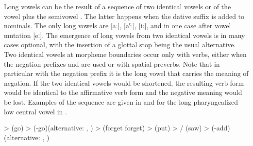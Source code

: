Long vowels can be the result of a sequence of two identical vowels or of the vowel  plus the semivowel . The latter happens when the dative suffix is added to nominals. The only long vowels are [aː], [aˁː], [iː], and in one case after vowel mutation [eː]. The emergence of long vowels from two identical vowels is in many cases optional, with the insertion of a glottal stop being the usual alternative. Two identical vowels at morpheme boundaries occur only with verbs, either when the negation prefixes  and  are used or with spatial preverbs. Note that in particular with the negation prefix it is the long vowel that carries the meaning of negation. If the two identical vowels would be shortened, the resulting verb form would be identical to the affirmative verb form and the negative meaning would be lost. Examples of the sequence are given in  and for the long pharyngealized low central vowel in .
%
\begin{exe}
	\ex	\label{ex:identical vowels A phon}
	\begin{xlist}
		\ex	{} >   (go)
		\ex	{} >   (-go)\newline\hspace*{1em}(alternative: , )
		\ex	{} >  \newline\hspace*{1em}(forget forget) 
		\ex	{} >  \newline\hspace*{1em}(put)
		\ex	{} > \slash{}  (saw)
		\ex	{} >   (-add)\newline\hspace*{1em}(alternative: , )
	\end{xlist}
\end{exe}

